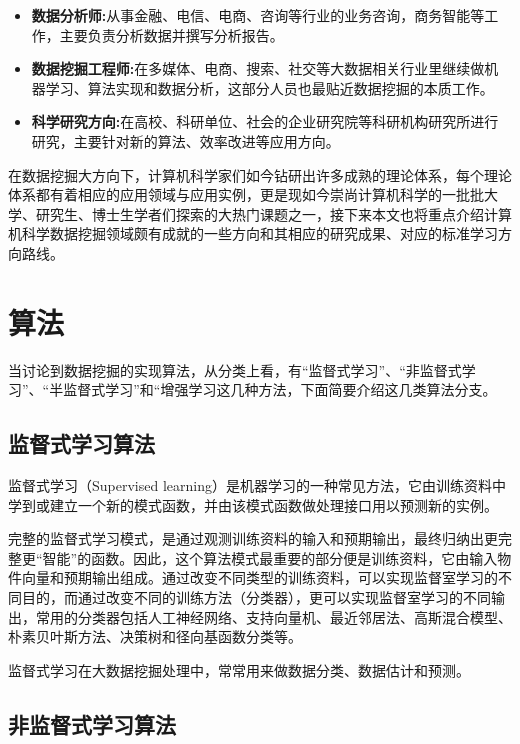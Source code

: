 \documentclass{elegantpaper}
\begin{document}
\begin{itemize}[noitemsep]
      \item \textbf{数据分析师:}从事金融、电信、电商、咨询等行业的业务咨询，商务智能等工作，主要负责分析数据并撰写分析报告。
      \item \textbf{数据挖掘工程师:}在多媒体、电商、搜索、社交等大数据相关行业里继续做机器学习、算法实现和数据分析，这部分人员也最贴近数据挖掘的本质工作。
      \item \textbf{科学研究方向:}在高校、科研单位、社会的企业研究院等科研机构研究所进行研究，主要针对新的算法、效率改进等应用方向。
\end{itemize}

在数据挖掘大方向下，计算机科学家们如今钻研出许多成熟的理论体系，每个理论体系都有着相应的应用领域与应用实例，更是现如今崇尚计算机科学的一批批大学、研究生、博士生学者们探索的大热门课题之一，接下来本文也将重点介绍计算机科学数据挖掘领域颇有成就的一些方向和其相应的研究成果、对应的标准学习方向路线。


\section{算法}

当讨论到数据挖掘的实现算法，从分类上看，有“监督式学习”、“非监督式学习”、“半监督式学习”和“增强学习这几种方法，下面简要介绍这几类算法分支。

\subsection{监督式学习算法}

监督式学习（Supervised learning）是机器学习的一种常见方法，它由训练资料中学到或建立一个新的模式函数，并由该模式函数做处理接口用以预测新的实例。

完整的监督式学习模式，是通过观测训练资料的输入和预期输出，最终归纳出更完整更“智能”的函数。因此，这个算法模式最重要的部分便是训练资料，它由输入物件向量和预期输出组成。通过改变不同类型的训练资料，可以实现监督室学习的不同目的，而通过改变不同的训练方法（分类器），更可以实现监督室学习的不同输出，常用的分类器包括人工神经网络、支持向量机、最近邻居法、高斯混合模型、朴素贝叶斯方法、决策树和径向基函数分类等。

监督式学习在大数据挖掘处理中，常常用来做数据分类、数据估计和预测。

\subsection{非监督式学习算法}
\end{document}
